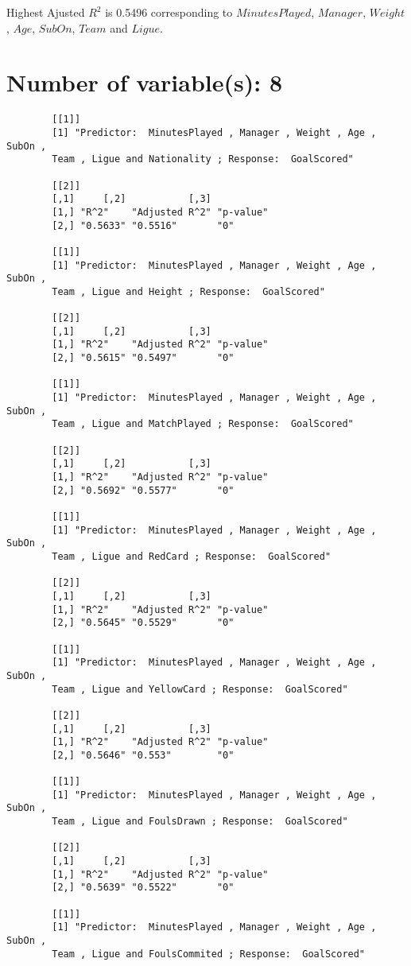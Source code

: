 \documentclass[12pt]{article}
\begin{document}
	Highest Ajusted $ R^2 $ is 0.5496 corresponding to $ MinutesPlayed $, $ Manager $, $ Weight $, $ Age $, $ SubOn $, $ Team $ and $ Ligue $.
	
	\section{Number of variable(s): 8}
	\begin{verbatim}
		[[1]]
		[1] "Predictor:  MinutesPlayed , Manager , Weight , Age , SubOn , 
		Team , Ligue and Nationality ; Response:  GoalScored"
		
		[[2]]
		[,1]     [,2]           [,3]     
		[1,] "R^2"    "Adjusted R^2" "p-value"
		[2,] "0.5633" "0.5516"       "0"      
		
		[[1]]
		[1] "Predictor:  MinutesPlayed , Manager , Weight , Age , SubOn , 
		Team , Ligue and Height ; Response:  GoalScored"
		
		[[2]]
		[,1]     [,2]           [,3]     
		[1,] "R^2"    "Adjusted R^2" "p-value"
		[2,] "0.5615" "0.5497"       "0"      
		
		[[1]]
		[1] "Predictor:  MinutesPlayed , Manager , Weight , Age , SubOn , 
		Team , Ligue and MatchPlayed ; Response:  GoalScored"
		
		[[2]]
		[,1]     [,2]           [,3]     
		[1,] "R^2"    "Adjusted R^2" "p-value"
		[2,] "0.5692" "0.5577"       "0"      
		
		[[1]]
		[1] "Predictor:  MinutesPlayed , Manager , Weight , Age , SubOn , 
		Team , Ligue and RedCard ; Response:  GoalScored"
		
		[[2]]
		[,1]     [,2]           [,3]     
		[1,] "R^2"    "Adjusted R^2" "p-value"
		[2,] "0.5645" "0.5529"       "0"      
		
		[[1]]
		[1] "Predictor:  MinutesPlayed , Manager , Weight , Age , SubOn , 
		Team , Ligue and YellowCard ; Response:  GoalScored"
		
		[[2]]
		[,1]     [,2]           [,3]     
		[1,] "R^2"    "Adjusted R^2" "p-value"
		[2,] "0.5646" "0.553"        "0"      
		
		[[1]]
		[1] "Predictor:  MinutesPlayed , Manager , Weight , Age , SubOn , 
		Team , Ligue and FoulsDrawn ; Response:  GoalScored"
		
		[[2]]
		[,1]     [,2]           [,3]     
		[1,] "R^2"    "Adjusted R^2" "p-value"
		[2,] "0.5639" "0.5522"       "0"      
		
		[[1]]
		[1] "Predictor:  MinutesPlayed , Manager , Weight , Age , SubOn , 
		Team , Ligue and FoulsCommited ; Response:  GoalScored"
		

\end{verbatim}
\end{document}
